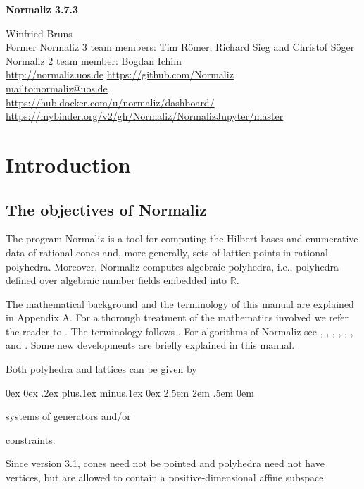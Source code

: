 \documentclass[12pt,a4paper]{scrartcl}
\newcounter{listi}
\newcommand{\stdli}{ \topsep0ex \partopsep0ex %
\parsep.2ex plus.1ex minus.1ex \itemsep0ex%
\leftmargin2.5em \labelwidth2em \labelsep.5em \rightmargin0em}%
\newenvironment{arab}{\begin{list}{\textup{(\arabic{listi})}}%
	{\usecounter{listi}\stdli}}{\end{list}}
\theoremstyle{definition}
\def\RR{{\mathbb R}}
\def\version{3.7.3}
\begin{document}
\vspace*{2cm}

\centerline{\Large\textbf{Normaliz \version}}

\vspace*{1.5cm}

\begin{center}Winfried Bruns\\[14pt]
	Former Normaliz 3 team members:  Tim R\"omer, Richard Sieg and Christof S\"oger\\[14pt]
	Normaliz 2 team member: Bogdan Ichim\\[14pt]
	\url{http://normaliz.uos.de}\qquad\qquad\qquad
	\url{https://github.com/Normaliz}\\[14pt]
	\url{mailto:normaliz@uos.de}\\[14pt]
	\url{https://hub.docker.com/u/normaliz/dashboard/}\\[14pt] 
	\url{https://mybinder.org/v2/gh/Normaliz/NormalizJupyter/master}
\end{center}



\tableofcontents

\newpage

\section{Introduction}\label{facil}

\subsection{The objectives of Normaliz}

The program Normaliz  is a tool for computing
the Hilbert bases and enumerative data of rational cones and, more generally, sets of lattice points in rational polyhedra. Moreover, Normaliz computes algebraic polyhedra, i.e., polyhedra defined over algebraic number fields embedded into $\RR$.

The mathematical background and the terminology of this manual are explained in Appendix A. For a thorough treatment of the  mathematics involved we refer the reader to
\cite{BG}. The terminology follows \cite{BG}. For
algorithms of Normaliz see  \cite{BHIKS},  \cite{BI}, \cite{BI2},
\cite{BIS},  \cite{BK02}, \cite{BSS}, and \cite{BS}. Some new developments are briefly explained in this manual.

Both polyhedra and lattices  can be given by
\begin{arab}
	\item systems of generators and/or
	\item constraints.
\end{arab}
Since version 3.1, cones need not be pointed and polyhedra need not have vertices, but are allowed to contain a positive-dimensional affine subspace.
\end{document}
